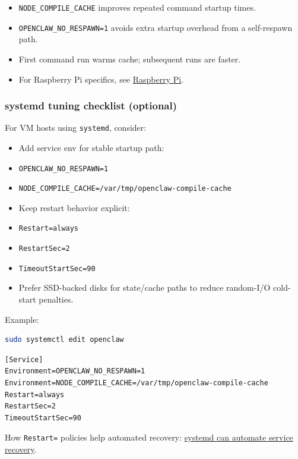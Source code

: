 \begin{itemize}
  \item \texttt{NODE\_COMPILE\_CACHE} improves repeated command startup times.
  \item \texttt{OPENCLAW\_NO\_RESPAWN=1} avoids extra startup overhead from a self-respawn path.
  \item First command run warms cache; subsequent runs are faster.
  \item For Raspberry Pi specifics, see \href{/platforms/raspberry-pi}{Raspberry Pi}.
\end{itemize}


\subsubsection{systemd tuning checklist (optional)}


For VM hosts using \texttt{systemd}, consider:

\begin{itemize}
  \item Add service env for stable startup path:
  \item \texttt{OPENCLAW\_NO\_RESPAWN=1}
  \item \texttt{NODE\_COMPILE\_CACHE=/var/tmp/openclaw-compile-cache}
  \item Keep restart behavior explicit:
  \item \texttt{Restart=always}
  \item \texttt{RestartSec=2}
  \item \texttt{TimeoutStartSec=90}
  \item Prefer SSD-backed disks for state/cache paths to reduce random-I/O cold-start penalties.
\end{itemize}


Example:

\begin{lstlisting}[language=bash]
sudo systemctl edit openclaw
\end{lstlisting}


\begin{lstlisting}
[Service]
Environment=OPENCLAW_NO_RESPAWN=1
Environment=NODE_COMPILE_CACHE=/var/tmp/openclaw-compile-cache
Restart=always
RestartSec=2
TimeoutStartSec=90
\end{lstlisting}


How \texttt{Restart=} policies help automated recovery:
\href{https://www.redhat.com/en/blog/systemd-automate-recovery}{systemd can automate service recovery}.


\clearpage
